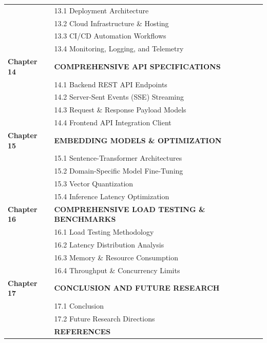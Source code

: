 \documentclass[12pt,a4paper]{article}
\begin{document}
\begin{longtable}{@{} p{2.2cm} p{11.8cm} r @{}}
& 13.1 Deployment Architecture & \pageref{sec:13.1} \\[3pt]
& 13.2 Cloud Infrastructure \& Hosting & \pageref{sec:13.2} \\[3pt]
& 13.3 CI/CD Automation Workflows & \pageref{sec:13.3} \\[3pt]
& 13.4 Monitoring, Logging, and Telemetry & \pageref{sec:13.4} \\[6pt]
\textbf{Chapter 14} & \textbf{COMPREHENSIVE API SPECIFICATIONS} & \pageref{chap:14} \\[4pt]
& 14.1 Backend REST API Endpoints & \pageref{sec:14.1} \\[3pt]
& 14.2 Server-Sent Events (SSE) Streaming & \pageref{sec:14.2} \\[3pt]
& 14.3 Request \& Response Payload Models & \pageref{sec:14.3} \\[3pt]
& 14.4 Frontend API Integration Client & \pageref{sec:14.4} \\[6pt]
\textbf{Chapter 15} & \textbf{EMBEDDING MODELS \& OPTIMIZATION} & \pageref{chap:15} \\[4pt]
& 15.1 Sentence-Transformer Architectures & \pageref{sec:15.1} \\[3pt]
& 15.2 Domain-Specific Model Fine-Tuning & \pageref{sec:15.2} \\[3pt]
& 15.3 Vector Quantization & \pageref{sec:15.3} \\[3pt]
& 15.4 Inference Latency Optimization & \pageref{sec:15.4} \\[6pt]
\textbf{Chapter 16} & \textbf{COMPREHENSIVE LOAD TESTING \& BENCHMARKS} & \pageref{chap:16} \\[4pt]
& 16.1 Load Testing Methodology & \pageref{sec:16.1} \\[3pt]
& 16.2 Latency Distribution Analysis & \pageref{sec:16.2} \\[3pt]
& 16.3 Memory \& Resource Consumption & \pageref{sec:16.3} \\[3pt]
& 16.4 Throughput \& Concurrency Limits & \pageref{sec:16.4} \\[6pt]
\textbf{Chapter 17} & \textbf{CONCLUSION AND FUTURE RESEARCH} & \pageref{chap:17} \\[4pt]
& 17.1 Conclusion & \pageref{sec:17.1} \\[3pt]
& 17.2 Future Research Directions & \pageref{sec:17.2} \\[6pt]
& \textbf{REFERENCES} & \pageref{sec:ref} \\
\end{longtable}
\end{document}
